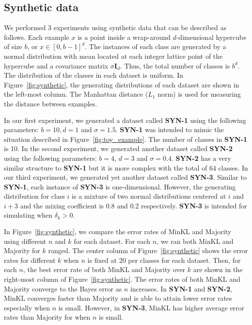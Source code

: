 \documentclass{article}
\begin{document}
\subsection{Synthetic data}
We performed 3 experiments using synthetic data that can be described
as follows. Each example $x$ is a point inside a wrap-around
$d$-dimensional hypercube of size $b$, or $x \in [0,b-1]^d$. The
instances of each class are generated by a normal distribution with
mean located at each integer lattice point of the hypercube and a
covariance matrix $\sigma \mathbf{I}_d$. Thus, the total number of
classes is $b^d$. The distribution of the classes in each dataset is
uniform. In Figure~\ref{fig:synthetic}, the generating distributions
of each dataset are shown in the left-most column. The Manhattan
distance ($L_1$ norm) is used for measuring the distance between
examples.

In our first experiment, we generated a dataset called \textbf{SYN-1}
using the following parameters: $b=10, d=1$ and
$\sigma=1.5$. \textbf{SYN-1} was intended to mimic the situation
described in Figure~\ref{fig:toy_example}. The number of classes in
\textbf{SYN-1} is 10. In the second experiment, we generated another
dataset called \textbf{SYN-2} using the following parameters: $b=4$,
$d=3$ and $\sigma=0.4$. \textbf{SYN-2} has a very similar structure to
\textbf{SYN-1} but it is more complex with the total of $64$
classes. In our third experiment, we generated yet another dataset
called \textbf{SYN-3}. Similar to \textbf{SYN-1}, each instance of
\textbf{SYN-3} is one-dimensional. However, the generating
distribution for class $i$ is a mixture of two normal distributions
centered at $i$ and $i+3$ and the mixing coefficient is 0.8 and 0.2
respectively. \textbf{SYN-3} is intended for simulating when
$\delta_k > 0$.  

In Figure~\ref{fig:synthetic}, we compare the error rates of MinKL and
Majority using different $n$ and $k$ for each dataset. For each $n$,
we ran both MinKL and Majority for $k$ ranged. The center column of
Figure~\ref{fig:synthetic} shows the error rates for different $k$
when $n$ is fixed at 20 per classes for each dataset. Then, for each
$n$, the best error rate of both MinKL and Majority over $k$ are shown
in the right-most column of Figure~\ref{fig:synthetic}. The error
rates of both MinKL and Majority converge to the Bayes error as $n$
increases. In \textbf{SYN-1} and \textbf{SYN-2}, MinKL converges
faster than Majority and is able to attain lower error rates
especially when $n$ is small. However, in \textbf{SYN-3}, MinKL has
higher average error rates than Majority for when $n$ is small.
\end{document}
